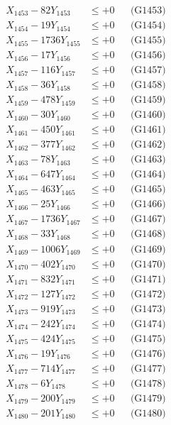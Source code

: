 \documentclass[a4paper,10pt]{article}
\begin{document}
{\begin{align}
X_{1453} - 82Y_{1453} &\leq +0 && \text{(G1453)} \\
X_{1454} - 19Y_{1454} &\leq +0 && \text{(G1454)} \\
X_{1455} - 1736Y_{1455} &\leq +0 && \text{(G1455)} \\
X_{1456} - 17Y_{1456} &\leq +0 && \text{(G1456)} \\
X_{1457} - 116Y_{1457} &\leq +0 && \text{(G1457)} \\
X_{1458} - 36Y_{1458} &\leq +0 && \text{(G1458)} \\
X_{1459} - 478Y_{1459} &\leq +0 && \text{(G1459)} \\
X_{1460} - 30Y_{1460} &\leq +0 && \text{(G1460)} \\
\allowbreak
X_{1461} - 450Y_{1461} &\leq +0 && \text{(G1461)} \\
X_{1462} - 377Y_{1462} &\leq +0 && \text{(G1462)} \\
X_{1463} - 78Y_{1463} &\leq +0 && \text{(G1463)} \\
X_{1464} - 647Y_{1464} &\leq +0 && \text{(G1464)} \\
X_{1465} - 463Y_{1465} &\leq +0 && \text{(G1465)} \\
X_{1466} - 25Y_{1466} &\leq +0 && \text{(G1466)} \\
X_{1467} - 1736Y_{1467} &\leq +0 && \text{(G1467)} \\
X_{1468} - 33Y_{1468} &\leq +0 && \text{(G1468)} \\
X_{1469} - 1006Y_{1469} &\leq +0 && \text{(G1469)} \\
X_{1470} - 402Y_{1470} &\leq +0 && \text{(G1470)} \\
\allowbreak
X_{1471} - 832Y_{1471} &\leq +0 && \text{(G1471)} \\
X_{1472} - 127Y_{1472} &\leq +0 && \text{(G1472)} \\
X_{1473} - 919Y_{1473} &\leq +0 && \text{(G1473)} \\
X_{1474} - 242Y_{1474} &\leq +0 && \text{(G1474)} \\
X_{1475} - 424Y_{1475} &\leq +0 && \text{(G1475)} \\
X_{1476} - 19Y_{1476} &\leq +0 && \text{(G1476)} \\
X_{1477} - 714Y_{1477} &\leq +0 && \text{(G1477)} \\
X_{1478} - 6Y_{1478} &\leq +0 && \text{(G1478)} \\
X_{1479} - 200Y_{1479} &\leq +0 && \text{(G1479)} \\
X_{1480} - 201Y_{1480} &\leq +0 && \text{(G1480)} \\

\end{align}}
\end{document}
